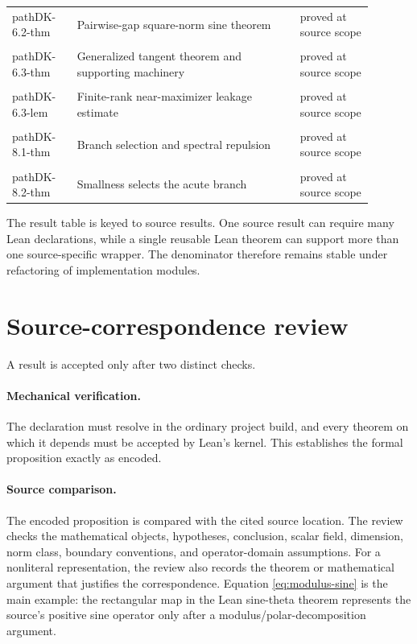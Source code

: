\begin{longtable}{>{\raggedright\arraybackslash}p{0.16\linewidth}>{\raggedright\arraybackslash}p{0.55\linewidth}>{\raggedright\arraybackslash}p{0.18\linewidth}}
\\path{DK-6.2-thm} & Pairwise-gap square-norm sine theorem & proved at source scope \\
\\path{DK-6.3-thm} & Generalized tangent theorem and supporting machinery & proved at source scope \\
\\path{DK-6.3-lem} & Finite-rank near-maximizer leakage estimate & proved at source scope \\
\\path{DK-8.1-thm} & Branch selection and spectral repulsion & proved at source scope \\
\\path{DK-8.2-thm} & Smallness selects the acute branch & proved at source scope \\
\bottomrule
\end{longtable}

The result table is keyed to source results.  One source result can require many
Lean declarations, while a single reusable Lean theorem can support more than
one source-specific wrapper.  The denominator therefore remains stable under
refactoring of implementation modules.

\section{Source-correspondence review}
\label{app:source-review}

A result is accepted only after two distinct checks.

\paragraph{Mechanical verification.}
The declaration must resolve in the ordinary project build, and every theorem
on which it depends must be accepted by Lean's kernel.  This establishes the
formal proposition exactly as encoded.

\paragraph{Source comparison.}
The encoded proposition is compared with the cited source location.  The review
checks the mathematical objects, hypotheses, conclusion, scalar field,
dimension, norm class, boundary conventions, and operator-domain assumptions.
For a nonliteral representation, the review also records the theorem or
mathematical argument that justifies the correspondence.  Equation
\cref{eq:modulus-sine} is the main example: the rectangular map in the Lean
sine-theta theorem represents the source's positive sine operator only after a
modulus/polar-decomposition argument.

